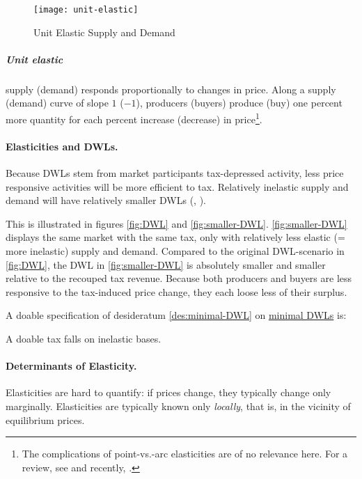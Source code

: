  \begin{figure}[htbp]
	\centering
	\texttt{[image: unit-elastic]}
	\caption{Unit Elastic Supply and Demand}
	\label{fig:unit-elastic}
\end{figure}

\subparagraph{Unit elastic}
supply (demand) responds proportionally to changes in price.
Along a supply (demand) curve of slope $1$ ($-1$), producers (buyers) produce (buy) one percent more quantity for each percent increase (decrease) in price\footnote{The complications of point-vs.-arc elasticities are of no relevance here.
For a review, see \cite{Allen1933} and recently, \cite{Vaughan1988}.}.

\paragraph{Elasticities and DWLs.}
Because DWLs stem from market participants tax-depressed activity, less price responsive activities will be more efficient to tax.
Relatively inelastic supply and demand will have relatively smaller DWLs (\citealt{Ramsey}, \citealt[16]{Piatkowski2008}).


This is illustrated in figures \ref{fig:DWL} and \ref{fig:smaller-DWL}.
\autoref{fig:smaller-DWL} displays the same market with the same tax, only with relatively less elastic (= more inelastic) supply and demand.
Compared to the original DWL-scenario in \autoref{fig:DWL}, the DWL in \autoref{fig:smaller-DWL} is absolutely smaller and smaller relative to the recouped tax revenue.
Because both producers and buyers are less responsive to the tax-induced price change, they each loose less of their surplus.

A doable specification of desideratum \ref{des:minimal-DWL} on \href{des:minimal-DWL}{minimal DWLs} is:

\begin{desideratum}
	A doable tax falls on inelastic bases.
	\label{des:tax-inelastic}
\end{desideratum}

\paragraph{Determinants of Elasticity.}
Elasticities are hard to quantify:
if prices change, they typically change only marginally.
Elasticities are typically known only \emph{locally}, that is, in the vicinity of equilibrium prices.

